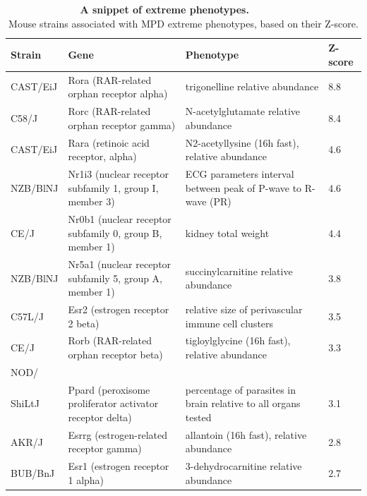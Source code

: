 \documentclass[fleqn,11pt]{SelfArx}
\begin{document}
\begin{table}[H]
\centering
\begin{tabulary}{\linewidth}{ LLLL }
\hline
	\textbf{Strain} & \textbf{Gene}  & \textbf{Phenotype} & \textbf{Z-score}
	\\  
	\hline \hline 
	CAST/EiJ  & Rora (RAR-related orphan receptor alpha) & trigonelline relative abundance &  8.8 \\
	C58/J  & Rorc (RAR-related orphan receptor gamma) & N-acetylglutamate relative abundance & 8.4\\ 
	CAST/EiJ  & Rara (retinoic acid receptor, alpha) & N2-acetyllysine (16h fast), relative abundance &  4.6\\ 
	NZB/BlNJ & Nr1i3 (nuclear receptor subfamily 1, group I, member 3) & ECG parameters interval between peak of P-wave to R-wave (PR) &  4.6\\ 
	CE/J & Nr0b1 (nuclear receptor subfamily 0, group B, member 1) & kidney total weight &  4.4\\
	NZB/BlNJ  & Nr5a1 (nuclear receptor subfamily 5, group A, member 1) & succinylcarnitine relative abundance  &  3.8\\
	C57L/J & Esr2 (estrogen receptor 2 beta) & relative size of perivascular immune cell clusters &  3.5\\
	CE/J & Rorb (RAR-related orphan receptor beta) & tigloylglycine (16h fast), relative abundance&  3.3\\
	NOD/\\ShiLtJ & Ppard (peroxisome proliferator activator receptor delta) & percentage of parasites in brain relative to all organs tested &  3.1\\ 
	AKR/J & Esrrg (estrogen-related receptor gamma) & allantoin (16h fast), relative abundance &  2.8\\
	BUB/BnJ & Esr1 (estrogen receptor 1 alpha) & 3-dehydrocarnitine  relative abundance &  2.7\\    
	\hline
\end{tabulary}
\caption{\footnotesize{\textbf{A snippet of extreme phenotypes.} 
~~~~~~~\\
Mouse strains associated with MPD extreme phenotypes, based on their Z-score.}} 
\label{tab:top10pheno}
\end{table}

\end{document}
